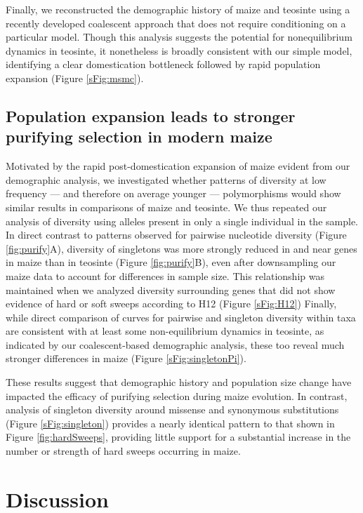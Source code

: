 \documentclass{pnastwo}
\begin{document}
\begin{article}
Finally, we reconstructed the demographic history of maize and teosinte using a recently developed coalescent approach \cite{schiffels2014}  that does not require conditioning on a particular model.
Though this analysis suggests the potential for nonequilibrium dynamics in teosinte, it nonetheless is broadly consistent with our simple model,   identifying a clear domestication bottleneck followed by rapid population expansion (Figure \ref{sFig:msmc}). 

\subsection{Population expansion leads to stronger purifying selection in modern maize}
Motivated by the rapid post-domestication expansion of maize evident from our demographic analysis, we investigated whether patterns of diversity at low frequency --- and therefore on average younger --- polymorphisms would show similar results in comparisons of maize and teosinte.
We thus repeated our analysis of diversity using alleles present in only a single individual in the sample.
In direct contrast to patterns observed for pairwise nucleotide diversity (Figure \ref{fig:purify}A), diversity of singletons was more strongly reduced in and near genes in maize than in teosinte (Figure \ref{fig:purify}B), even after downsampling our maize data to account for differences in sample size. This relationship was maintained when we analyzed diversity surrounding genes that did not show evidence of hard or soft sweeps according to H12 (Figure \ref{sFig:H12})
Finally, while direct comparison of curves for pairwise and singleton diversity within taxa are consistent with at least some non-equilibrium dynamics in teosinte, as indicated by our coalescent-based demographic analysis, these too reveal much stronger differences in maize (Figure \ref{sFig:singletonPi}). 

These results suggest that demographic history and population size change have impacted the efficacy of purifying selection during maize evolution.
In contrast, analysis of singleton diversity around missense and synonymous substitutions (Figure \ref{sFig:singleton}) provides a nearly identical pattern to that shown in Figure \ref{fig:hardSweeps}, providing little support for a substantial increase in the number or strength of hard sweeps occurring in maize.  

\section{Discussion}


\end{article}
\end{document}
